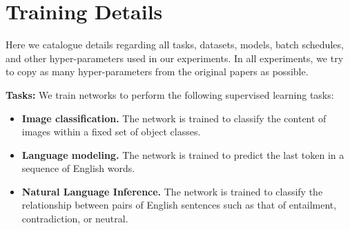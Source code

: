 \section{Training Details}\label{sec:training_outline}
Here we catalogue details regarding all tasks, datasets, models, batch schedules, and other hyper-parameters used in our experiments. In all experiments, we try to copy as many hyper-parameters from the original papers as possible.

\textbf{Tasks: }We train networks to perform the following supervised learning tasks:
\begin{itemize}[noitemsep,topsep=0pt,parsep=0pt,partopsep=0pt,leftmargin=*]

\item 
\textbf{Image classification.} 
The network is trained to classify the content of images within a fixed set of object classes.

\item
\textbf{Language modeling.}
The network is trained to predict the last token in a sequence of English words.

\item
\textbf{Natural Language Inference.}
The network is trained to classify the relationship between pairs of English sentences such as that of entailment, contradiction, or neutral.
\end{itemize}

